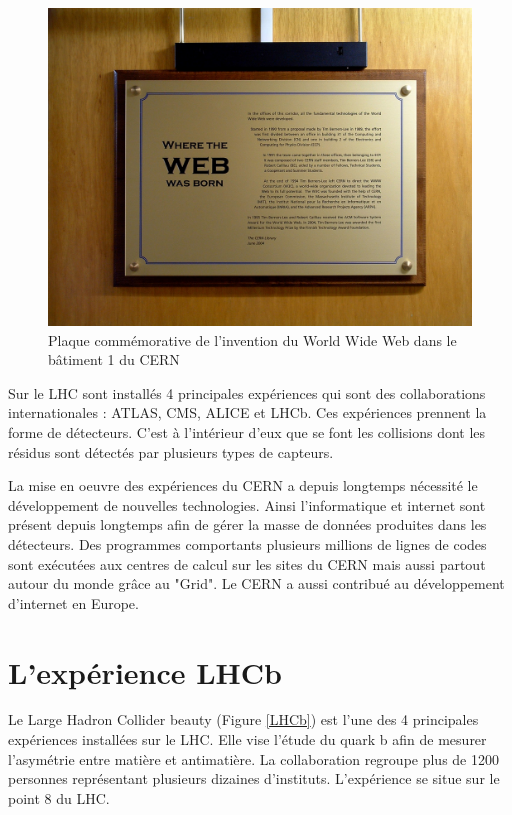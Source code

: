 \documentclass[a4paper]{report}
\begin{document}
        \begin{figure}[!htb]
            \includegraphics[width=\textwidth, center]{WEB.jpg}
            \caption{Plaque commémorative de l'invention du World Wide Web dans le bâtiment 1 du CERN}
            \label{WEB}
        \end{figure}

        Sur le LHC sont installés 4 principales expériences qui sont des collaborations internationales : ATLAS, CMS, ALICE et LHCb.
        Ces expériences prennent la forme de détecteurs. C'est à l'intérieur d'eux que se font les collisions dont les résidus sont détectés par plusieurs types de capteurs.

        La mise en oeuvre des expériences du CERN a depuis longtemps nécessité le développement de nouvelles technologies.
        Ainsi l'informatique et internet sont présent depuis longtemps afin de gérer la masse de données produites dans les détecteurs.
        Des programmes comportants plusieurs millions de lignes de codes sont exécutées aux centres de calcul sur les sites du CERN mais aussi partout autour du monde grâce au "Grid".
        Le CERN a aussi contribué au développement d'internet en Europe.

        \section{L'expérience LHCb}
        Le Large Hadron Collider beauty (Figure \ref{LHCb}) est l'une des 4 principales expériences installées sur le LHC.
        Elle vise l'étude du quark b afin de mesurer l'asymétrie entre matière et antimatière.
        La collaboration regroupe plus de 1200 personnes représentant plusieurs dizaines d'instituts.
        L'expérience se situe sur le point 8 du LHC.
\end{document}
